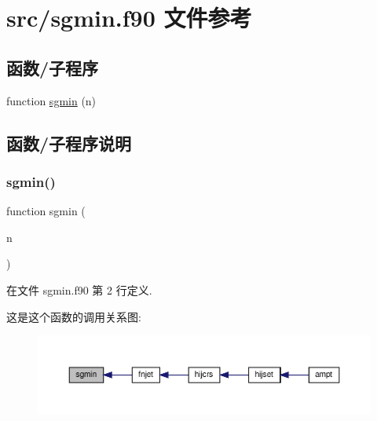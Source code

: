 \hypertarget{sgmin_8f90}{}\section{src/sgmin.f90 文件参考}
\label{sgmin_8f90}
\subsection*{函数/子程序}
\begin{DoxyCompactItemize}
\item 
function \mbox{\hyperlink{sgmin_8f90_af27bdebc6d6ec79a916e79229528393d}{sgmin}} (n)
\end{DoxyCompactItemize}


\subsection{函数/子程序说明}
\mbox{\label{sgmin_8f90_af27bdebc6d6ec79a916e79229528393d}} 
\subsubsection{\texorpdfstring{sgmin()}{sgmin()}}
{\footnotesize\ttfamily function sgmin (\begin{DoxyParamCaption}\item[{}]{n }\end{DoxyParamCaption})}



在文件 sgmin.\+f90 第 2 行定义.

这是这个函数的调用关系图\+:
\nopagebreak
\begin{figure}[H]
\begin{center}
\leavevmode
\includegraphics[width=350pt]{sgmin_8f90_af27bdebc6d6ec79a916e79229528393d_icgraph}
\end{center}
\end{figure}
